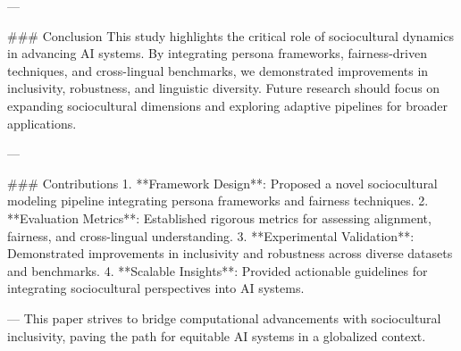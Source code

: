 ---

### Conclusion  
This study highlights the critical role of sociocultural dynamics in advancing AI systems. By integrating persona frameworks, fairness-driven techniques, and cross-lingual benchmarks, we demonstrated improvements in inclusivity, robustness, and linguistic diversity. Future research should focus on expanding sociocultural dimensions and exploring adaptive pipelines for broader applications.  

---

### Contributions  
1. **Framework Design**: Proposed a novel sociocultural modeling pipeline integrating persona frameworks and fairness techniques.  
2. **Evaluation Metrics**: Established rigorous metrics for assessing alignment, fairness, and cross-lingual understanding.  
3. **Experimental Validation**: Demonstrated improvements in inclusivity and robustness across diverse datasets and benchmarks.  
4. **Scalable Insights**: Provided actionable guidelines for integrating sociocultural perspectives into AI systems.  

---  
This paper strives to bridge computational advancements with sociocultural inclusivity, paving the path for equitable AI systems in a globalized context.